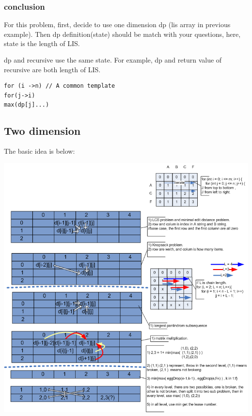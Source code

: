 \documentclass[a4paper,11pt,twoside]{book}
\begin{document}
\subsubsection{conclusion}

	\par For this problem, first, decide to use one dimension dp (lis array in previous example). Then dp definition(state) should be match with your questions, here, state is the length of LIS. 
	
	\par dp and recursive use the same state. For example, dp and return value of recursive are both length of LIS.
	
\begin{lstlisting}[numbers=none]
for (i ->n) // A common template
for(j->i)
max(dp[j]...)	
\end{lstlisting}	
	

\subsection{Two dimension}

%	
	
	
	\par The basic idea is below: 
\begin{center}
	\includegraphics[scale=0.65]{pics/two_dimension.png} 
\end{center}
	
\end{document}
